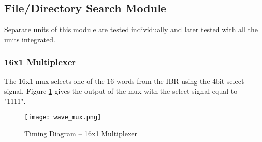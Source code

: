 \subsection{File/Directory Search Module}
    Separate units of this module are tested individually and later tested with all the units integrated.

\subsubsection{16x1 Multiplexer}
    The 16x1 mux selects one of the 16 words from the IBR using the 4bit select signal. Figure \ref{fig:wave_mux} gives the output of the mux with the select signal equal to "1111".

\begin{figure}[!ht]
	\centering	\texttt{[image: wave\_mux.png]}
		\caption{ Timing Diagram -- 16x1 Multiplexer}
	\label{fig:wave_mux}
\end{figure}


